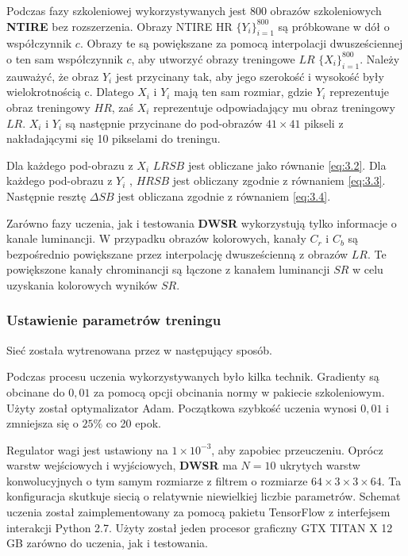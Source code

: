Podczas fazy szkoleniowej wykorzystywanych jest $800$ obrazów szkoleniowych \textbf{NTIRE} \cite{8014883} bez rozszerzenia. Obrazy NTIRE HR 
$\{Y_i\}^{800}_{i=1}$ są próbkowane w dół o współczynnik $c$. 
Obrazy te są powiększane za pomocą interpolacji dwusześciennej o ten sam współczynnik $c$, aby utworzyć obrazy treningowe $LR$ 
$\{X_i\}^{800}_{i=1}$. Należy zauważyć, że obraz $Y_i$ jest przycinany tak, aby jego szerokość i wysokość były wielokrotnością c. Dlatego $X_i$ i $Y_i$ mają ten sam rozmiar, gdzie $Y_i$ reprezentuje obraz treningowy $HR$, zaś $X_i$ reprezentuje odpowiadający mu obraz treningowy $LR$. $X_i$ i $Y_i$ są następnie przycinane do pod-obrazów $41 \times  41$ pikseli z nakładającymi się 10 pikselami do treningu.

Dla każdego pod-obrazu z $X_i$ $LRSB$ jest obliczane jako równanie \ref{eq:3.2}. Dla każdego pod-obrazu z $Y_i$ , $HRSB$ jest obliczany zgodnie z równaniem \ref{eq:3.3}. Następnie resztę $\Delta SB$ jest obliczana zgodnie z równaniem \ref{eq:3.4}.

Zarówno fazy uczenia, jak i testowania \textbf{DWSR} \cite{guo2017deep} wykorzystują tylko informacje o kanale luminancji. W przypadku obrazów kolorowych, kanały $C_r$ i $C_b$ są bezpośrednio powiększane przez interpolację dwusześcienną z obrazów $LR$. Te powiększone kanały chrominancji są łączone z kanałem luminancji $SR$ w celu uzyskania kolorowych wyników $SR$.


\subsubsection*{Ustawienie parametrów treningu}

Sieć została wytrenowana przez \cite{guo2017deep} w następujący sposób.

Podczas procesu uczenia wykorzystywanych było kilka technik. Gradienty są obcinane do $0,01$ za pomocą opcji obcinania normy w pakiecie szkoleniowym. Użyty został optymalizator Adam. Początkowa szybkość uczenia wynosi $0,01$ i zmniejsza się o $25\%$ co 20 epok. 

Regulator wagi jest ustawiony na $1 \times 10^{-3}$, aby zapobiec przeuczeniu. Oprócz warstw wejściowych i wyjściowych, \textbf{DWSR} ma $N = 10$ ukrytych warstw konwolucyjnych o tym samym rozmiarze z filtrem o rozmiarze $64 \times 3 \times 3 \times 64$. Ta konfiguracja skutkuje siecią o relatywnie niewielkiej liczbie parametrów. Schemat uczenia został zaimplementowany za pomocą pakietu TensorFlow z interfejsem interakcji Python 2.7. Użyty został jeden procesor graficzny GTX TITAN X 12 GB zarówno do uczenia, jak i testowania.


